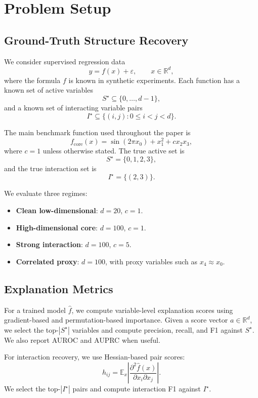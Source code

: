 \documentclass[11pt]{article}
\newcommand{\E}{\mathbb{E}}
\begin{document}
\section{Problem Setup}

\subsection{Ground-Truth Structure Recovery}

We consider supervised regression data
\[
    y = f(x) + \varepsilon, \qquad x \in \mathbb{R}^d,
\]
where the formula $f$ is known in synthetic experiments.
Each function has a known set of active variables
\[
    S^\star \subseteq \{0,\dots,d-1\},
\]
and a known set of interacting variable pairs
\[
    I^\star \subseteq \{(i,j):0 \leq i < j < d\}.
\]

The main benchmark function used throughout the paper is
\[
    f_{\mathrm{core}}(x)
    =
    \sin(2\pi x_0) + x_1^2 + c x_2 x_3,
\]
where $c=1$ unless otherwise stated.
The true active set is
\[
    S^\star = \{0,1,2,3\},
\]
and the true interaction set is
\[
    I^\star = \{(2,3)\}.
\]

We evaluate three regimes:
\begin{itemize}[leftmargin=2em]
    \item \textbf{Clean low-dimensional}: $d=20$, $c=1$.
    \item \textbf{High-dimensional core}: $d=100$, $c=1$.
    \item \textbf{Strong interaction}: $d=100$, $c=5$.
    \item \textbf{Correlated proxy}: $d=100$, with proxy variables such as $x_4 \approx x_0$.
\end{itemize}

\subsection{Explanation Metrics}

For a trained model $\hat f$, we compute variable-level explanation scores using gradient-based and permutation-based importance.
Given a score vector $a \in \mathbb{R}^d$, we select the top-$|S^\star|$ variables and compute precision, recall, and F1 against $S^\star$.
We also report AUROC and AUPRC when useful.

For interaction recovery, we use Hessian-based pair scores:
\[
    h_{ij}
    =
    \E_x \left| \frac{\partial^2 \hat f(x)}{\partial x_i \partial x_j} \right|.
\]
We select the top-$|I^\star|$ pairs and compute interaction F1 against $I^\star$.
\end{document}
